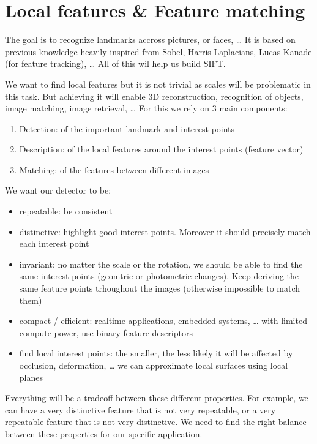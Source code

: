 \documentclass[
  a4paper,
  ,captions=tableheading
]{scrartcl}
\providecommand{\tightlist}{%
  \setlength{\itemsep}{0pt}\setlength{\parskip}{0pt}}
\begin{document}
\section{Local features \& Feature
matching}\label{local-features-feature-matching}

The goal is to recognize landmarks accross pictures, or faces, \ldots{}
It is based on previous knowledge heavily inspired from Sobel, Harris
Laplacians, Lucas Kanade (for feature tracking), \ldots{} All of this
wil help us build SIFT.

We want to find local features but it is not trivial as scales will be
problematic in this task. But achieving it will enable 3D
reconstruction, recognition of objects, image matching, image retrieval,
\ldots{} For this we rely on 3 main components:

\begin{enumerate}
\def\labelenumi{\arabic{enumi}.}
\tightlist
\item
  Detection: of the important landmark and interest points
\item
  Description: of the local features around the interest points (feature
  vector)
\item
  Matching: of the features between different images
\end{enumerate}

We want our detector to be:

\begin{itemize}
\tightlist
\item
  repeatable: be consistent
\item
  distinctive: highlight good interest points. Moreover it should
  precisely match each interest point
\item
  invariant: no matter the scale or the rotation, we should be able to
  find the same interest points (geomtric or photometric changes). Keep
  deriving the same feature points trhoughout the images (otherwise
  impossible to match them)
\item
  compact / efficient: realtime applications, embedded systems, \ldots{}
  with limited compute power, use binary feature descriptors
\item
  find local interest points: the smaller, the less likely it will be
  affected by occlusion, deformation, \ldots{} we can approximate local
  surfaces using local planes
\end{itemize}

Everything will be a tradeoff between these different properties. For
example, we can have a very distinctive feature that is not very
repeatable, or a very repeatable feature that is not very distinctive.
We need to find the right balance between these properties for our
specific application.
\end{document}
